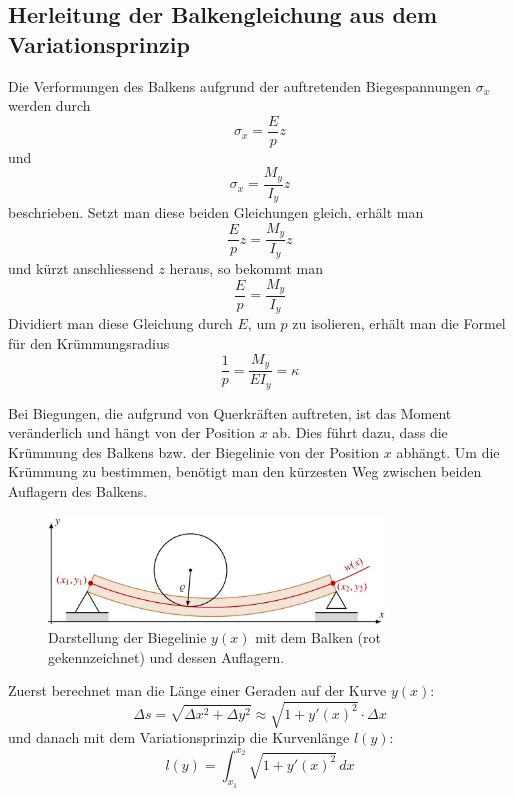 \subsection{Herleitung der Balkengleichung aus dem Variationsprinzip}
Die Verformungen des Balkens aufgrund der auftretenden Biegespannungen $σ_x$ werden durch
\begin{equation}
	\sigma_x = \frac{E}{p} z
\end{equation}
und
\begin{equation}
	\sigma_x = \frac{M_y}{I_y} z
\end{equation}
beschrieben. Setzt man diese beiden Gleichungen gleich, erhält man
\begin{equation}
	\frac{E}{p} z = \frac{M_y}{I_y} z
\end{equation}
und kürzt anschliessend $z$ heraus, so bekommt man
\begin{equation}
	\frac{E}{p} = \frac{M_y}{I_y}
\end{equation}
Dividiert man diese Gleichung durch $E$, um $p$ zu isolieren, erhält man die Formel für den Krümmungsradius
\begin{equation}
	\frac{1}{p} = \frac{M_y}{E I_y} = \kappa
\end{equation}

Bei Biegungen, die aufgrund von Querkräften auftreten, ist das Moment veränderlich und hängt von der Position $x$ ab. Dies führt dazu, dass die Krümmung des Balkens bzw. der Biegelinie von der Position $x$ abhängt. Um die Krümmung zu bestimmen, benötigt man den kürzesten Weg zwischen beiden Auflagern des Balkens.
\begin{figure}[h]
	\centering
	\includegraphics[width=0.8\textwidth]{papers/balken/images/teil2/BiegungBalke2.jpg}
	\caption{Darstellung der Biegelinie $y(x)$ mit dem Balken (rot gekennzeichnet) und dessen Auflagern.}
	\label{fig:Darstellung_der_Biegelinie}
\end{figure}

Zuerst berechnet man die Länge einer Geraden auf der Kurve $y(x)$:
\begin{equation}
	\Delta s = \sqrt{\Delta x^2 + \Delta y^2} \approx \sqrt{1 + y'(x)^2} \cdot \Delta x
\end{equation}
und danach mit dem Variationsprinzip die Kurvenlänge $l(y)$:
\begin{equation}
	l(y) = \int_{x_1}^{x_2} \sqrt{1 + {y'(x)}^2} \, dx
\end{equation}

